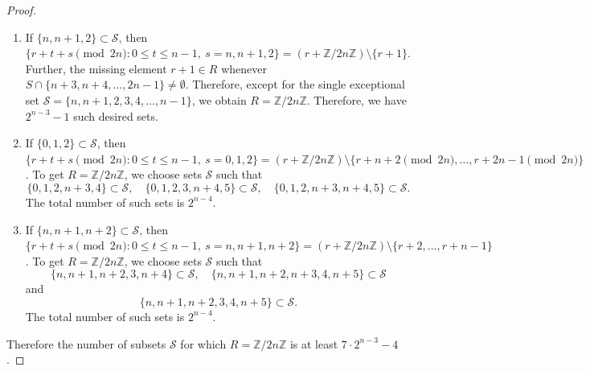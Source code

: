 \documentclass[11pt,reqno]{amsart}
\numberwithin{equation}{section}
\begin{document}
\begin{proof}
\begin{enumerate}
\item If $\{n,n+1,2\}\subset\mathcal{S}$,  then $\{r+t+s\pmod{2n}:0\leq t\leq n-1,\ s=n,n+1,2\}=(r+\mathbb{Z}/2n\mathbb{Z})\setminus\{r+1\}$.  Further, the missing element $r+1\in R$ whenever $S\cap \{n+3,n+4,\ldots,2n-1\}\neq \emptyset$. Therefore, except for the single exceptional set $\mathcal{S}=\{n,n+1,2,3,4,\ldots, n-1\}$, we obtain $R=\mathbb{Z}/2n\mathbb{Z}$. Therefore, we have $2^{n-3}-1$ such desired sets. 


\item  If $\{0,1,2\}\subset\mathcal{S}$, then $\{r+t+s\pmod{2n}:0\leq t\leq n-1,\ s=0,1,2\}=(r+\mathbb{Z}/2n\mathbb{Z})\setminus\{r+n+2\pmod{2n},\ldots, r+2n-1\pmod{2n}\}$. To get $R=\mathbb{Z}/2n\mathbb{Z}$, we choose sets $\mathcal{S}$ such that
$$\{0,1,2,n+3,4\}\subset \mathcal{S},\quad \{0,1,2,3,n+4,5\}\subset \mathcal{S} , \quad \{0,1,2,n+3,n+4,5\}\subset \mathcal{S}.$$
The total number of such sets is $2^{n-4}$.


\item If $\{n,n+1,n+2\}\subset\mathcal{S}$, then $\{r+t+s\pmod{2n}:0\leq t\leq n-1,\ s=n,n+1,n+2\}=(r+\mathbb{Z}/2n\mathbb{Z})\setminus\{r+2,\ldots, r+n-1\}$. To get $R=\mathbb{Z}/2n\mathbb{Z}$, we choose sets $\mathcal{S}$ such that
$$\{n,n+1,n+2,3,n+4\}\subset\mathcal{S},\quad \{n,n+1,n+2,n+3,4,n+5\}\subset \mathcal{S}$$ and $$\{n,n+1,n+2,3,4,n+5\}\subset \mathcal{S}.$$
The total number of such sets is $2^{n-4}$. 
\end{enumerate}
Therefore the number of subsets $\mathcal{S}$ for which $R=\mathbb{Z}/2n\mathbb{Z}$ is at least $7\cdot 2^{n-3}-4$.
\end{proof}
\end{document}
